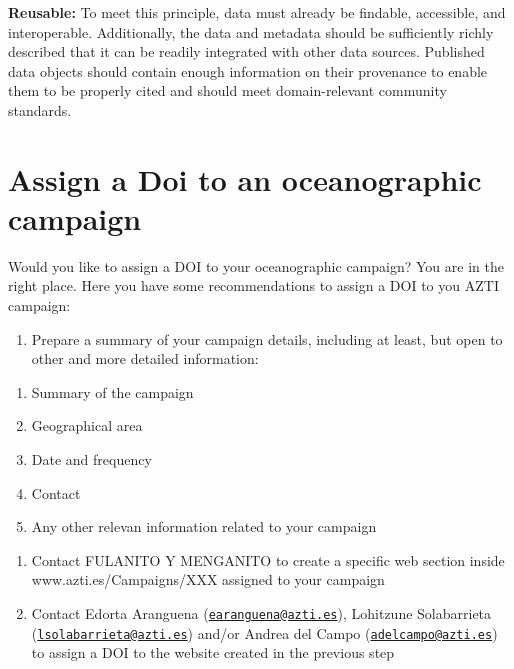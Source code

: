 \documentclass[
]{book}
\providecommand{\tightlist}{%
  \setlength{\itemsep}{0pt}\setlength{\parskip}{0pt}}
\begin{document}
\textbf{Reusable:} To meet this principle, data must already be findable, accessible, and interoperable. Additionally, the data and metadata should be sufficiently richly described that it can be readily integrated with other data sources. Published data objects should contain enough information on their provenance to enable them to be properly cited and should meet domain-relevant community standards.

\hypertarget{assign-a-doi-to-an-oceanographic-campaign}{%
\chapter{Assign a Doi to an oceanographic campaign}\label{assign-a-doi-to-an-oceanographic-campaign}}

Would you like to assign a DOI to your oceanographic campaign? You are in the right place. Here you have some recommendations to assign a DOI to you AZTI campaign:

\begin{enumerate}
\def\labelenumi{\arabic{enumi}.}
\tightlist
\item
  Prepare a summary of your campaign details, including at least, but open to other and more detailed information:
\end{enumerate}

\begin{enumerate}
\def\labelenumi{\alph{enumi}.}
\tightlist
\item
  Summary of the campaign
\item
  Geographical area
\item
  Date and frequency
\item
  Contact
\item
  Any other relevan information related to your campaign
\end{enumerate}

\begin{enumerate}
\def\labelenumi{\arabic{enumi}.}
\setcounter{enumi}{1}
\item
  Contact FULANITO Y MENGANITO to create a specific web section inside www.azti.es/Campaigns/XXX assigned to your campaign
\item
  Contact Edorta Aranguena (\href{mailto:earanguena@azti.es}{\nolinkurl{earanguena@azti.es}}), Lohitzune Solabarrieta (\href{mailto:lsolabarrieta@azti.es}{\nolinkurl{lsolabarrieta@azti.es}}) and/or Andrea del Campo (\href{mailto:adelcampo@azti.es}{\nolinkurl{adelcampo@azti.es}}) to assign a DOI to the website created in the previous step
\end{enumerate}
\end{document}

